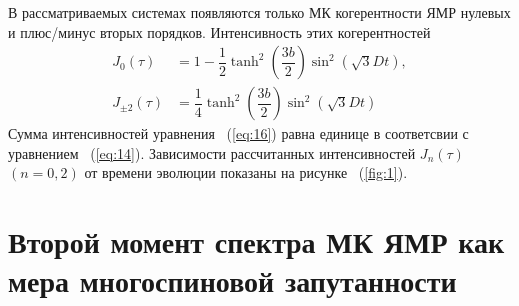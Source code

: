 \documentclass[utf8]{jetp}
\begin{document}
В рассматриваемых системах появляются только МК когерентности ЯМР нулевых и плюс/минус вторых порядков.
Интенсивность этих когерентностей
%
\begin{equation}
    \begin{split}
        \label{eq:16}
        J_0(\tau) & = 1 
        - \dfrac 1 2 \tanh^2\left( \dfrac{3b}{2} \right)
            \sin^2 \left( \sqrt{3} Dt \right), 
        \\
        J_{\pm2}(\tau) & = \dfrac{1}{4} 
            \tanh^2 \left( \dfrac{3b}{2} \right)
            \sin^2 \left( \sqrt{3} Dt \right)
    \end{split}
\end{equation}
%
Сумма интенсивностей уравнения ~(\ref{eq:16}) равна единице в соответсвии с уравнением ~(\ref{eq:14}).
Зависимости рассчитанных интенсивностей $J_{n}(\tau)$ $(n=0,2)$ от времени эволюции показаны на рисунке ~(\ref{fig:1}).



\section{Второй момент спектра МК ЯМР как мера многоспиновой запутанности}
\label{sec:4}
\end{document}

